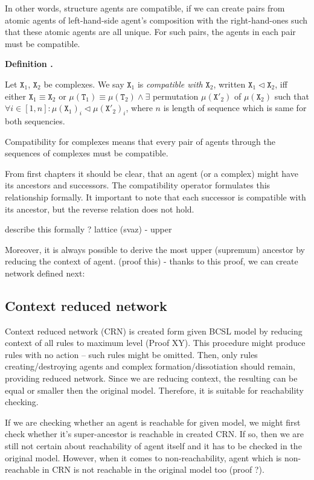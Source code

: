 \documentclass[12pt]{fithesis2}
\newcounter{counter}[section]
\renewcommand{\thecounter}{\thesection.\arabic{counter}}
\newenvironment{definition}{\medskip\refstepcounter{counter}\textbf{Definition \thecounter}\par\nopagebreak\noindent}{\medskip}
\begin{document}
In other words, structure agents are compatible, if we can create pairs from atomic agents of left-hand-side agent's composition with the right-hand-ones such that these atomic agents are all unique. For such pairs, the agents in each pair must be compatible.

\begin{definition}
Let $\mathtt{X}_1$, $\mathtt{X}_2$ be complexes. We say $\mathtt{X}_1$ is \emph{compatible with} $\mathtt{X}_2$, written $\mathtt{X}_1 \lhd \mathtt{X}_2$, iff either $\mathtt{X}_1 \equiv \mathtt{X}_2$ or $\mu(\mathtt{T}_1) \equiv \mu(\mathtt{T}_2) \wedge \exists$ permutation $ \mu(\mathtt{X}'_2)$ of $\mu(\mathtt{X}_2)$ such that $ \forall i \in [1, n] : \mu(\mathtt{X}_1)_i \lhd \mu(\mathtt{X}'_2)_i $, where $n$ is length of sequence which is same for both sequencies.
\end{definition}

Compatibility for complexes means that every pair of agents through the sequences of complexes must be compatible.

From first chapters it should be clear, that an agent (or a complex) might have its ancestors and successors. The compatibility operator formulates this relationship formally. It important to note that each successor is compatible with its ancestor, but the reverse relation does not hold. 

describe this formally ? lattice (svaz) - upper

Moreover, it is always possible to derive the most upper (supremum) ancestor by reducing the context of agent. (proof this) - thanks to this proof, we can create network defined next:

\subsection{Context reduced network}

Context reduced network (CRN) is created form given BCSL model by reducing context of all rules to maximum level (Proof XY). This procedure might produce rules with no action -- such rules might be omitted. Then, only rules creating/destroying agents and complex formation/dissotiation should remain, providing reduced network. Since we are reducing context, the resulting can be equal or smaller then the original model. Therefore, it is suitable for reachability checking. 

If we are checking whether an agent is reachable for given model, we might first check whether it's super-ancestor is reachable in created CRN. If so, then we are still not certain about reachability of agent itself and it has to be checked in the original model. However, when it comes to non-reachability, agent which is non-reachable in CRN is not reachable in the original model too (proof ?).
\end{document}
